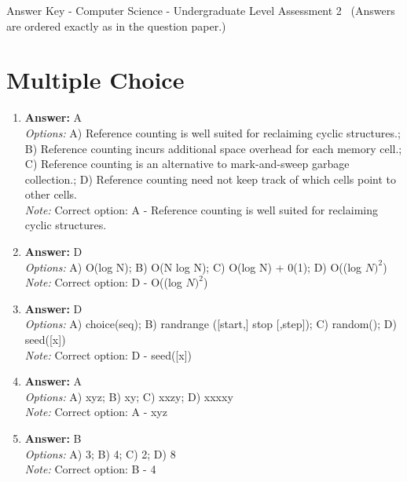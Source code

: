 \documentclass[12pt]{article}
\begin{document}
\begin{center}
Answer Key - Computer Science - Undergraduate Level Assessment 2 \
\small (Answers are ordered exactly as in the question paper.)
\end{center}

\section*{Multiple Choice}
\begin{enumerate}[label=\arabic*.]
\item \textbf{Answer:} A
\\ \textit{Options:} A) Reference counting is well suited for reclaiming cyclic structures.; B) Reference counting incurs additional space overhead for each memory cell.; C) Reference counting is an alternative to mark-and-sweep garbage collection.; D) Reference counting need not keep track of which cells point to other cells.
\\ \textit{Note:} Correct option: A - Reference counting is well suited for reclaiming cyclic structures.
\item \textbf{Answer:} D
\\ \textit{Options:} A) O(log N); B) O(N log N); C) O(log N) + 0(1); D) O((log $N)^2$)
\\ \textit{Note:} Correct option: D - O((log $N)^2$)
\item \textbf{Answer:} D
\\ \textit{Options:} A) choice(seq); B) randrange ([start,] stop [,step]); C) random(); D) seed([x])
\\ \textit{Note:} Correct option: D - seed([x])
\item \textbf{Answer:} A
\\ \textit{Options:} A) xyz; B) xy; C) xxzy; D) xxxxy
\\ \textit{Note:} Correct option: A - xyz
\item \textbf{Answer:} B
\\ \textit{Options:} A) 3; B) 4; C) 2; D) 8
\\ \textit{Note:} Correct option: B - 4
\end{enumerate}
\end{document}
